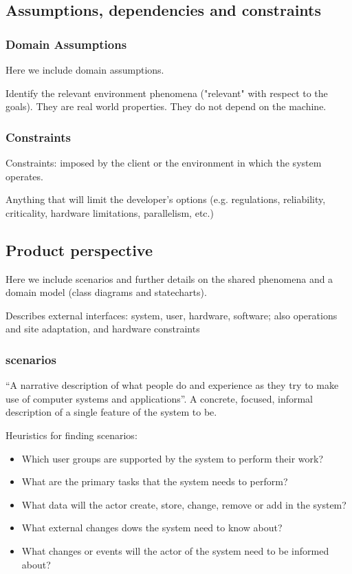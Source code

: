 \subsection{Assumptions, dependencies and constraints}
\label{subsect:assumptionsdependenciescostraints}

\subsubsection{Domain Assumptions}
\label{subsubsect:domainassumptions}

Here we include domain assumptions.

Identify the relevant environment phenomena ("relevant" with respect to the goals). They are real world properties. They do not depend on the machine.

\subsubsection{Constraints}
\label{subsubsect:contraints}

Constraints: imposed by the client or the environment in which the system operates. 

Anything that will limit the developer’s options (e.g. regulations, reliability, criticality, hardware limitations, parallelism, etc.)


\subsection{Product perspective}
\label{subsect:productperspective}

Here we include scenarios and further details on the shared phenomena and a domain model (class diagrams and statecharts).

Describes external interfaces: system, user, hardware, software; also operations and site adaptation, and hardware constraints

\subsubsection{scenarios}
\label{subsubsect:scenarios}

“A narrative description of what people do and experience as they try to make use of computer systems and applications”.
A concrete, focused, informal description of a single feature of the system to be.

Heuristics for finding scenarios:
\begin{itemize}
    \item Which user groups are supported by the system to perform their work?
    \item What are the primary tasks that the system needs to perform?
    \item What data will the actor create, store, change, remove or add in the system?
    \item What external changes dows the system need to know about?
    \item What changes or events will the actor of the system need to be informed about?
\end{itemize}

